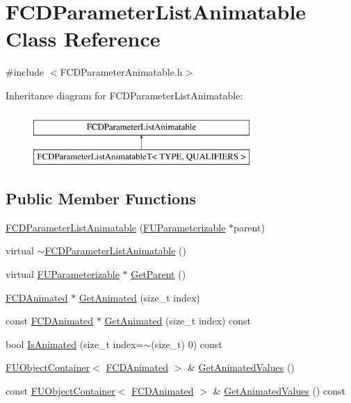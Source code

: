 \hypertarget{classFCDParameterListAnimatable}{
\section{FCDParameterListAnimatable Class Reference}
\label{classFCDParameterListAnimatable}
}


{\ttfamily \#include $<$FCDParameterAnimatable.h$>$}

Inheritance diagram for FCDParameterListAnimatable:\begin{figure}[H]
\begin{center}
\leavevmode
\includegraphics[height=2.000000cm]{classFCDParameterListAnimatable}
\end{center}
\end{figure}
\subsection*{Public Member Functions}
\begin{DoxyCompactItemize}
\item 
\hyperlink{classFCDParameterListAnimatable_aab7bce9e1d72680f76a27fedfdee4fb5}{FCDParameterListAnimatable} (\hyperlink{classFUParameterizable}{FUParameterizable} $\ast$parent)
\item 
virtual \hyperlink{classFCDParameterListAnimatable_a4c7467dc2053b50cd8aac7ec8cbe6daa}{$\sim$FCDParameterListAnimatable} ()
\item 
virtual \hyperlink{classFUParameterizable}{FUParameterizable} $\ast$ \hyperlink{classFCDParameterListAnimatable_a8730d6ab1f478da7ff8510fa46693c5c}{GetParent} ()
\item 
\hyperlink{classFCDAnimated}{FCDAnimated} $\ast$ \hyperlink{classFCDParameterListAnimatable_a5b6a461611d9e53b7c21ce92956a5b45}{GetAnimated} (size\_\-t index)
\item 
const \hyperlink{classFCDAnimated}{FCDAnimated} $\ast$ \hyperlink{classFCDParameterListAnimatable_a4b99387f17182a5885df2f356e56abad}{GetAnimated} (size\_\-t index) const 
\item 
bool \hyperlink{classFCDParameterListAnimatable_a0c72ae40090c584d4444a5ea18a0dea7}{IsAnimated} (size\_\-t index=$\sim$(size\_\-t) 0) const 
\item 
\hyperlink{classFUObjectContainer}{FUObjectContainer}$<$ \hyperlink{classFCDAnimated}{FCDAnimated} $>$ \& \hyperlink{classFCDParameterListAnimatable_a7b16dc971e16a0dbd3aa310833db59ac}{GetAnimatedValues} ()
\item 
const \hyperlink{classFUObjectContainer}{FUObjectContainer}$<$ \hyperlink{classFCDAnimated}{FCDAnimated} $>$ \& \hyperlink{classFCDParameterListAnimatable_af9854bc7e739b316aa4badd4cf27ab6e}{GetAnimatedValues} () const 
\end{DoxyCompactItemize}

